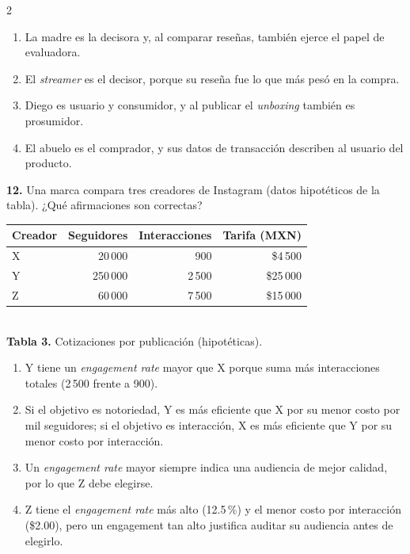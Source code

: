 \documentclass[10pt,letterpaper]{article}
\newcommand{\cas}{\framebox[1.0em]{\rule{0pt}{1.05ex}}}
\begin{document}
\begin{multicols}{2}
\begin{minipage}[t]{\columnwidth}
\begin{enumerate}[label=\cas\ \alph*),leftmargin=2.3em,itemsep=1.2pt,topsep=1pt,parsep=0pt,partopsep=0pt]
\item La madre es la decisora y, al comparar reseñas, también ejerce el papel de evaluadora.
\item El \textit{streamer} es el decisor, porque su reseña fue lo que más pesó en la compra.
\item Diego es usuario y consumidor, y al publicar el \textit{unboxing} también es prosumidor.
\item El abuelo es el comprador, y sus datos de transacción describen al usuario del producto.
\end{enumerate}\end{minipage}\par\vspace{3pt}
\begin{minipage}[t]{\columnwidth}\noindent\textbf{12.} Una marca compara tres creadores de Instagram (datos hipotéticos de la tabla). ¿Qué afirmaciones son correctas?
\begin{center}{\scriptsize\renewcommand{\arraystretch}{1.05}\begin{tabular}{@{}lrrr@{}}\toprule
Creador & Seguidores & Interacciones & Tarifa (MXN)\\\midrule
X & 20\,000 & 900 & \$4\,500\\ Y & 250\,000 & 2\,500 & \$25\,000\\ Z & 60\,000 & 7\,500 & \$15\,000\\\bottomrule\end{tabular}}\\[1pt]{\tiny\textbf{Tabla 3.} Cotizaciones por publicación (hipotéticas).}\end{center}
\vspace{1pt}\begin{enumerate}[label=\cas\ \alph*),leftmargin=2.3em,itemsep=1.2pt,topsep=1pt,parsep=0pt,partopsep=0pt]
\item Y tiene un \textit{engagement rate} mayor que X porque suma más interacciones totales (2\,500 frente a 900).
\item Si el objetivo es notoriedad, Y es más eficiente que X por su menor costo por mil seguidores; si el objetivo es interacción, X es más eficiente que Y por su menor costo por interacción.
\item Un \textit{engagement rate} mayor siempre indica una audiencia de mejor calidad, por lo que Z debe elegirse.
\item Z tiene el \textit{engagement rate} más alto (12.5\,\%) y el menor costo por interacción (\$2.00), pero un engagement tan alto justifica auditar su audiencia antes de elegirlo.

\end{enumerate}
\end{minipage}
\end{multicols}
\end{document}
